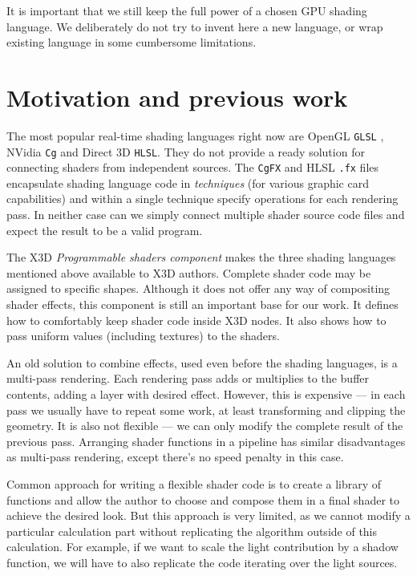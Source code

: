 \documentclass{egpubl}
\begin{document}
It is important that we still keep
the full power of a chosen GPU shading language.
We deliberately do not try to invent here a new language, or wrap existing
language in some cumbersome limitations.

\section{Motivation and previous work}

The most popular real-time shading languages right now are
OpenGL \texttt{GLSL} \cite{glsl:book}, NVidia \texttt{Cg} and Direct 3D \texttt{HLSL}.
They do not provide a ready solution for connecting shaders from independent sources.
The \texttt{CgFX} and HLSL \texttt{.fx} files encapsulate shading language code
in \emph{techniques} (for various graphic card capabilities)
and within a single technique specify operations for each rendering pass.
In neither case can we simply connect multiple shader source code files
and expect the result to be a valid program.

The X3D \textit{Programmable shaders component} \cite{x3d:shaders}
makes the three shading languages mentioned above available to X3D authors.
Complete shader code may be assigned to specific shapes.
Although it does not offer any way of compositing shader effects,
this component is still an important base for our work. It defines
how to comfortably keep shader code inside X3D nodes. It also shows
how to pass uniform values (including textures) to the shaders.

An old solution to combine effects, used even before the shading languages,
is a multi-pass rendering. Each rendering pass adds or multiplies
to the buffer contents, adding a layer with desired effect.
However, this is expensive --- in each pass we usually have to repeat
some work, at least transforming and clipping the geometry.
It is also not flexible --- we can only modify
the complete result of the previous pass.
Arranging shader functions in a pipeline has similar disadvantages
as multi-pass rendering, except there's no speed penalty in this case.

Common approach for writing a flexible shader code is to create
a library of functions and allow the author to choose and compose them
in a final shader to achieve the desired look. But this approach is very limited,
as we cannot modify a particular calculation part without
replicating the algorithm outside of this calculation.
For example, if we want to scale the light contribution by a shadow function,
we will have to also replicate the code iterating over the light sources.
\end{document}
